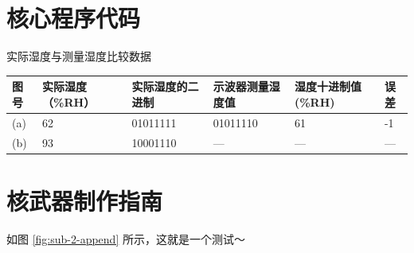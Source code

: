 \documentclass{thxythesis}
\begin{document}
\begin{Appendix}
\chapter{核心程序代码}

\begin{Table}[!h]
\caption{实际湿度与测量湿度比较数据}
\label{tab:t1-append}
\begin{tabular}{ p{2cm}<{\centering} |p{2cm}|p{2cm}|p{2cm}|p{2cm}|p{2cm}<{\centering}}
\hline
图号 & 实际湿度（\%RH）& 实际湿度的二进制 & 示波器测量湿度值 & 湿度十进制值(\%RH) & 误差 \\ \hline
(a) &  62  &  01011111  &  01011110   &   61  &  -1\\ \hline
(b) &  93  &  10001110  &  —  & —  & —\\ \hline
\end{tabular}
\end{Table}


\chapter{核武器制作指南}


如图 \ref{fig:sub-2-append} 所示，这就是一个测试～



\end{Appendix}
\end{document}
